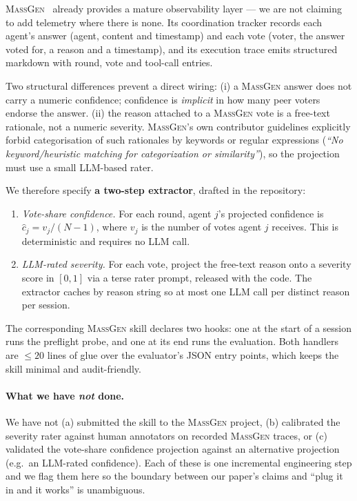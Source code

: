 \documentclass[10pt,a4paper]{article}
\begin{document}
\textsc{MassGen}~\citep{massgen2025github} already provides a mature
observability layer --- we are not claiming to add telemetry where there
is none. Its coordination tracker records each agent's answer (agent, content
and timestamp) and each vote (voter, the answer voted for, a reason and a
timestamp), and its execution trace emits structured markdown with round, vote
and tool-call entries.

Two structural differences prevent a direct wiring:
(i) a \textsc{MassGen} answer does not carry a numeric
confidence; confidence is \emph{implicit} in how many peer voters endorse
the answer.
(ii) the reason attached to a \textsc{MassGen} vote is a free-text rationale,
not a numeric severity.
\textsc{MassGen}'s own contributor guidelines explicitly forbid
categorisation of such rationales by keywords or regular expressions (\emph{``No
keyword/heuristic matching for categorization or similarity''}), so the
projection must use a small LLM-based rater.

We therefore specify \textbf{a two-step extractor}, drafted in the
repository:
\begin{enumerate}[leftmargin=*,topsep=0pt,itemsep=1pt]
  \item \emph{Vote-share confidence.} For each round, agent $j$'s projected
        confidence is $\hat{c}_j = v_j/(N{-}1)$, where $v_j$ is the number of
        votes agent $j$ receives. This
        is deterministic and requires no LLM call.
  \item \emph{LLM-rated severity.} For each vote, project the free-text
        reason onto a severity score in $[0,1]$ via a terse rater
        prompt, released with the code.
        The extractor caches by reason string so at most one LLM call per
        distinct reason per session.
\end{enumerate}

The corresponding \textsc{MassGen} skill declares two hooks: one at the start of
a session runs the preflight probe, and one at its end runs the evaluation. Both
handlers are $\leq 20$ lines of glue over the evaluator's JSON entry points, which
keeps the skill minimal and audit-friendly.

\paragraph{What we have \emph{not} done.} We have not (a) submitted the
skill to the \textsc{MassGen} project, (b) calibrated the severity rater
against human annotators on recorded \textsc{MassGen} traces, or (c) validated
the vote-share confidence projection against an alternative projection
(e.g.\ an LLM-rated confidence). Each of these is one incremental
engineering step and we flag them here so the boundary between our paper's
claims and ``plug it in and it works'' is unambiguous.
\end{document}
